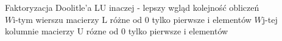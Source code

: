 \begin{frame}{Faktoryzacja Doolitle'a}
LU inaczej - lepszy wgląd kolejność obliczeń
\newline
\\
$W \mathrm{i}$-tym wierszu macierzy $\mathrm{L}$ różne od $0$ tylko pierwsze $\mathrm{i}$ element\'{o}w $W\mathrm{j}$-tej kolumnie macierzy $\mathrm{U}$ r\'{o}zne od $0$ tylko pierwsze $\mathrm{i}$ elementów

\end{frame}
